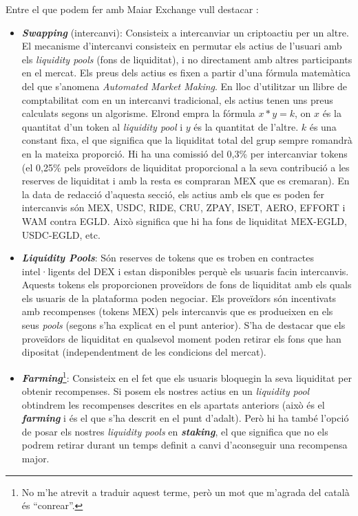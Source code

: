 \documentclass[11pt,a4paper]{article}
\begin{document}
Entre el que podem fer amb Maiar Exchange vull destacar \cite{everstake2021,elrond2021}:
\begin{itemize}
\item \textbf{\textit{Swapping}} (intercanvi): Consisteix a intercanviar un criptoactiu per un altre. El mecanisme d'intercanvi consisteix en permutar els actius de l'usuari amb els \textit{liquidity pools} (fons de liquiditat), i no directament amb altres participants en el mercat. Els preus dels actius es fixen a partir d'una fórmula matemàtica del que s'anomena \textit{Automated Market Making}. En lloc d'utilitzar un llibre de comptabilitat com en un intercanvi tradicional, els actius tenen uns preus calculats segons un algorisme. Elrond empra la fórmula \(x * y = k\), on \(x\) és la quantitat d'un token al \textit{liquidity pool} i \(y\) és la quantitat de l'altre. \(k\) és una constant fixa, el que significa que la liquiditat total del grup sempre romandrà en la mateixa proporció. Hi ha una comissió del 0,3\% per intercanviar tokens (el 0,25\% pels proveïdors de liquiditat proporcional a la seva contribució a les reserves de liquiditat i amb la resta es compraran MEX que es cremaran). En la data de redacció d'aquesta secció, els actius amb els que es poden fer intercanvis són MEX, USDC, RIDE, CRU, ZPAY, ISET, AERO, EFFORT i WAM contra  EGLD. Això significa que hi ha fons de liquiditat MEX-EGLD, USDC-EGLD, etc.
\item \textit{\textbf{Liquidity Pools}}:  Són reserves de tokens que es troben en contractes intel·ligents del DEX i estan disponibles perquè els usuaris facin intercanvis. Aquests tokens els proporcionen proveïdors de fons de liquiditat amb els quals els usuaris de la plataforma poden negociar. Els proveïdors són incentivats amb recompenses (tokens MEX) pels intercanvis que es produeixen en els seus \textit{pools} (segons s'ha explicat en el punt anterior). S'ha de destacar que els proveïdors de liquiditat en qualsevol moment poden retirar els fons que han dipositat (independentment de les condicions del mercat).  
\item \textit{\textbf{Farming}}\footnote{No m'he atrevit a traduir aquest terme, però un mot que m'agrada del català és ``conrear''.}: Consisteix en el fet que els usuaris bloquegin la seva liquiditat per obtenir recompenses. Si posem els nostres actius en un \textit{liquidity pool} obtindrem les recompenses descrites en els apartats anteriors (això és el \textit{\textbf{farming}} i és el que s'ha descrit en el punt d'adalt). Però hi ha també l'opció de posar els nostres \textit{liquidity pools} en \textit{\textbf{staking}}, el que significa que no els podrem retirar durant un temps definit a canvi d'aconseguir una recompensa major.
\end{itemize}
\end{document}
